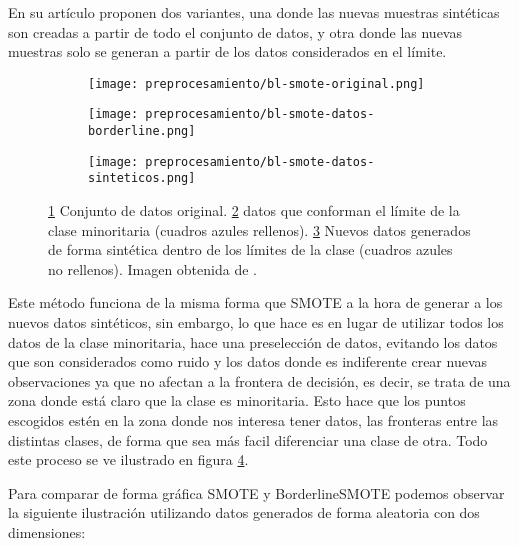En su artículo proponen dos variantes, una donde las nuevas muestras sintéticas son creadas a partir de todo el conjunto de datos, y otra donde las nuevas muestras solo se generan a partir de los datos considerados en el límite.


\begin{figure}[H]
    \centering
    \begin{subfigure}[b]{0.33\textwidth}
		  \texttt{[image: preprocesamiento/bl-smote-original.png]}
        \caption{}
        \label{fig:blSMOTE-orig}
    \end{subfigure}
    \begin{subfigure}[b]{0.33\textwidth}
        \texttt{[image: preprocesamiento/bl-smote-datos-borderline.png]}
        \caption{}
        \label{fig:blSMOTE-border}
    \end{subfigure}
    \begin{subfigure}[b]{0.33\textwidth}
        \texttt{[image: preprocesamiento/bl-smote-datos-sinteticos.png]}
        \caption{}
        \label{fig:blSMOTE-sintetico}
    \end{subfigure}

    \caption{\ref{fig:blSMOTE-orig} Conjunto de datos original. \ref{fig:blSMOTE-border} datos que conforman el límite de la clase minoritaria (cuadros azules rellenos). \ref{fig:blSMOTE-sintetico} Nuevos datos generados de forma sintética dentro de los límites de la clase (cuadros azules no rellenos). Imagen obtenida de \cite{BL-SMOTE}.}
	 \label{fig:ejemploBL-SMOTE}

\end{figure}

Este método funciona de la misma forma que SMOTE a la hora de generar a los nuevos datos sintéticos, sin embargo, lo que hace es en lugar de utilizar todos los datos de la clase minoritaria, hace una preselección de datos, evitando los datos que son considerados como ruido y los datos donde es indiferente crear nuevas observaciones ya que no afectan a la frontera de decisión, es decir, se trata de una zona donde está claro que la clase es minoritaria. Esto hace que los puntos escogidos estén en la zona donde nos interesa tener datos, las fronteras entre las distintas clases, de forma que sea más facil diferenciar una clase de otra. Todo este proceso se ve ilustrado en figura \ref{fig:ejemploBL-SMOTE}.


Para comparar de forma gráfica SMOTE y BorderlineSMOTE podemos observar la siguiente ilustración utilizando datos generados de forma aleatoria con dos dimensiones:

